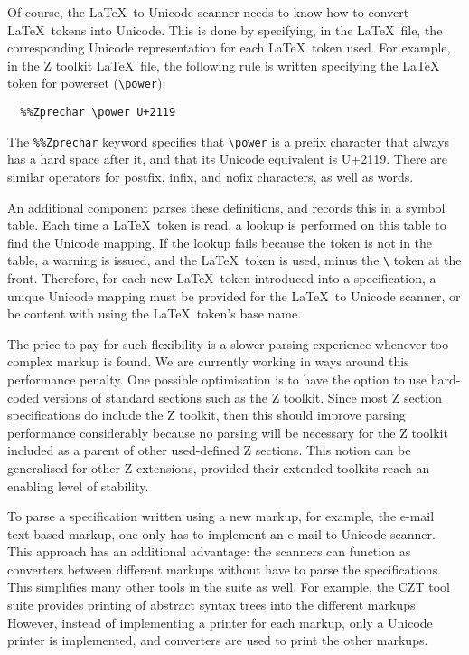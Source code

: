 \documentclass{llncs}
\begin{document}
Of course, the \LaTeX~to Unicode scanner needs to know how to convert
\LaTeX~tokens into Unicode. This is done by specifying, in the \LaTeX\ file,
the corresponding Unicode representation for each \LaTeX~token used. For example, in
the Z toolkit \LaTeX~file, the following rule is written specifying the \LaTeX~
token for powerset (\verb+\power+):
\begin{verbatim}
  %%Zprechar \power U+2119
\end{verbatim}
%
The {\tt \%\%Zprechar} keyword specifies that \verb+\power+ is a
prefix character that always has a hard space after it, and
that its Unicode equivalent is U+2119. There are similar operators for
postfix, infix, and nofix characters, as well as words.

An additional component parses these definitions, and records this in
a symbol table. Each time a \LaTeX~token is read, a lookup is
performed on this table to find the Unicode mapping. If the lookup
fails because the token is not in the table, a warning is issued, and
the \LaTeX~token is used, minus the \verb+\+ token at the
front. Therefore, for each new \LaTeX~token introduced into a
specification, a unique Unicode mapping must be provided for the
\LaTeX~to Unicode scanner, or be content with using the \LaTeX~token's
base name.

The price to pay for such flexibility is a slower parsing experience
whenever too complex markup is found.  We are currently working in
ways around this performance penalty.  One possible optimisation is to
have the option to use hard-coded versions of standard sections such
as the Z toolkit.  Since most Z section specifications do include the
Z toolkit, then this should improve parsing performance considerably
because no parsing will be necessary for the Z toolkit included as a
parent of other used-defined Z sections.  This notion can be
generalised for other Z extensions, provided their extended toolkits reach
an enabling level of stability.

To parse a specification written using a new markup, for example, the
e-mail text-based markup, one only has to implement an e-mail to Unicode
scanner. This approach has an additional advantage: the scanners can function as
converters between different markups without have to parse the
specifications. This simplifies many other tools in the suite as
well. For example, the CZT tool suite provides printing of abstract
syntax trees into the different markups. However, instead of
implementing a printer for each markup, only a Unicode printer is
implemented, and converters are used to print the other markups.
\end{document}
